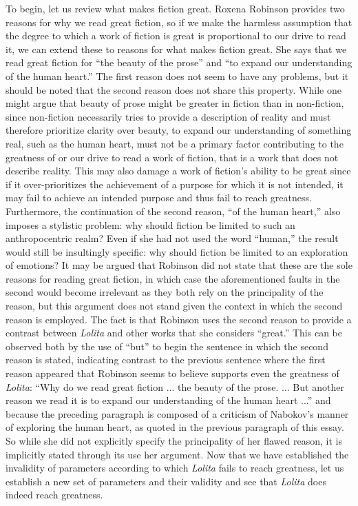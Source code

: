 \documentclass[12pt]{article}
\begin{document}
To begin, let us review what makes fiction great. Roxena Robinson provides two reasons for why we read great fiction, so if we make the harmless assumption that the degree to which a work of fiction is great is proportional to our drive to read it, we can extend these to reasons for what makes fiction great. She says that we read great fiction for ``the beauty of the prose'' and ``to expand our understanding of the human heart.'' The first reason does not seem to have any problems, but it should be noted that the second reason does not share this property. While one might argue that beauty of prose might be greater in fiction than in non-fiction, since non-fiction necessarily tries to provide a description of reality and must therefore prioritize clarity over beauty, to expand our understanding of something real, such as the human heart, must not be a primary factor contributing to the greatness of or our drive to read a work of fiction, that is a work that does not describe reality. This may also damage a work of fiction's ability to be great since if it over-prioritizes the achievement of a purpose for which it is not intended, it may fail to achieve an intended purpose and thus fail to reach greatness. Furthermore, the continuation of the second reason, ``of the human heart,'' also imposes a stylistic problem: why should fiction be limited to such an anthropocentric realm? Even if she had not used the word ``human,'' the result would still be insultingly specific: why should fiction be limited to an exploration of emotions? It may be argued that Robinson did not state that these are the sole reasons for reading great fiction, in which case the aforementioned faults in the second would become irrelevant as they both rely on the principality of the reason, but this argument does not stand given the context in which the second reason is employed. The fact is that Robinson uses the second reason to provide a contrast between \textit{Lolita} and other works that she considers ``great.'' This can be observed both by the use of ``but'' to begin the sentence in which the second reason is stated, indicating contrast to the previous sentence where the first reason appeared that Robinson seems to believe supports even the greatness of \textit{Lolita}: ``Why do we read great fiction ... the beauty of the prose. ... But another reason we read it is to expand our understanding of the human heart ...'' and because the preceding paragraph is composed of a criticism of Nabokov's manner of exploring the human heart, as quoted in the previous paragraph of this essay. So while she did not explicitly specify the principality of her flawed reason, it is implicitly stated through its use her argument. Now that we have established the invalidity of parameters according to which \textit{Lolita} fails to reach greatness, let us establish a new set of parameters and their validity and see that \textit{Lolita} does indeed reach greatness.
\end{document}
